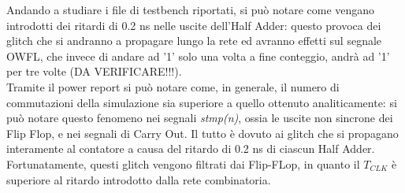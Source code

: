 Andando a studiare i file di testbench riportati, si può notare come vengano introdotti dei ritardi di 0.2 ns nelle uscite dell'Half Adder: questo provoca dei glitch che si andranno a propagare lungo la rete ed avranno effetti sul segnale OWFL, che invece di andare ad '1' solo una volta a fine conteggio, andrà ad '1' per tre volte (DA VERIFICARE!!!).\\
Tramite il power report si può notare come, in generale, il numero di commutazioni della simulazione sia superiore a quello ottenuto analiticamente: si può notare questo fenomeno nei segnali \textit{stmp(n)}, ossia le uscite non sincrone dei Flip Flop, e nei segnali di Carry Out. Il tutto è dovuto ai glitch che si propagano interamente al contatore a causa del ritardo di 0.2 ns di ciascun Half Adder. \\
Fortunatamente, questi glitch vengono filtrati dai Flip-FLop, in quanto il $T_{CLK}$ è superiore al ritardo introdotto dalla rete combinatoria.
